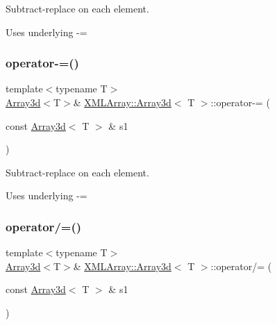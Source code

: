 Subtract-\/replace on each element. 

Uses underlying -\/= \mbox{\label{classXMLArray_1_1Array3d_a9d4e2f24b2d52634a926ec4fb758828b}} 
\subsubsection{\texorpdfstring{operator-\/=()}{operator-=()}\hspace{0.1cm}{\footnotesize\ttfamily [2/2]}}
{\footnotesize\ttfamily template$<$typename T$>$ \\
\mbox{\hyperlink{classXMLArray_1_1Array3d}{Array3d}}$<$T$>$\& \mbox{\hyperlink{classXMLArray_1_1Array3d}{X\+M\+L\+Array\+::\+Array3d}}$<$ T $>$\+::operator-\/= (\begin{DoxyParamCaption}\item[{const \mbox{\hyperlink{classXMLArray_1_1Array3d}{Array3d}}$<$ T $>$ \&}]{s1 }\end{DoxyParamCaption})\hspace{0.3cm}{\ttfamily [inline]}}



Subtract-\/replace on each element. 

Uses underlying -\/= \mbox{\label{classXMLArray_1_1Array3d_a67c611b25c5969b9b340959fde49f602}} 
\subsubsection{\texorpdfstring{operator/=()}{operator/=()}\hspace{0.1cm}{\footnotesize\ttfamily [1/4]}}
{\footnotesize\ttfamily template$<$typename T$>$ \\
\mbox{\hyperlink{classXMLArray_1_1Array3d}{Array3d}}$<$T$>$\& \mbox{\hyperlink{classXMLArray_1_1Array3d}{X\+M\+L\+Array\+::\+Array3d}}$<$ T $>$\+::operator/= (\begin{DoxyParamCaption}\item[{const \mbox{\hyperlink{classXMLArray_1_1Array3d}{Array3d}}$<$ T $>$ \&}]{s1 }\end{DoxyParamCaption})\hspace{0.3cm}{\ttfamily [inline]}}



